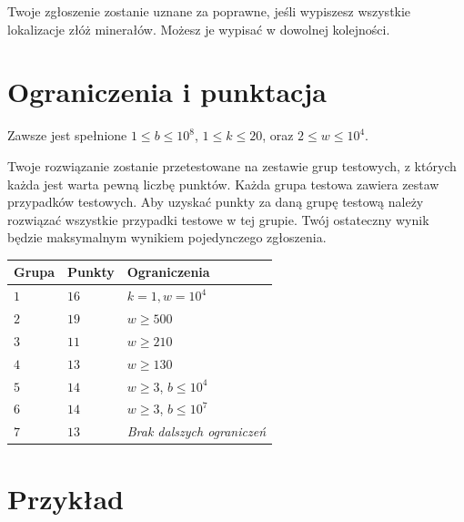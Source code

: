 Twoje zgłoszenie zostanie uznane za poprawne, jeśli wypiszesz wszystkie lokalizacje złóż minerałów.
Możesz je wypisać w dowolnej kolejności.

\section*{Ograniczenia i punktacja}

Zawsze jest spełnione 
$1\leq b \leq 10^8$, %
$1 \leq k \leq 20$, %
oraz
$2 \le w \le 10^4$. %

Twoje rozwiązanie zostanie przetestowane na zestawie grup testowych, z których każda jest warta pewną liczbę punktów.
Każda grupa testowa zawiera zestaw przypadków testowych.
Aby uzyskać punkty za daną grupę testową należy rozwiązać wszystkie przypadki testowe w tej grupie.
Twój ostateczny wynik będzie maksymalnym wynikiem pojedynczego zgłoszenia.

\medskip
\begin{tabular}{lll}
Grupa & Punkty & Ograniczenia \\\hline
  $1$ & $16$ & $k = 1, w = 10^4$\\
  $2$ & $19$ & $w \ge 500$\\
  $3$ & $11$ & $w \ge 210$\\
  $4$ & $13$ & $w \ge 130$\\
  $5$ & $14$ & $w \ge 3$, $b \le 10^4$\\
  $6$ & $14$ & $w \ge 3$, $b \le 10^7$\\
  $7$ & $13$ & \emph{Brak dalszych ograniczeń}
\end{tabular}

\section*{Przykład}

